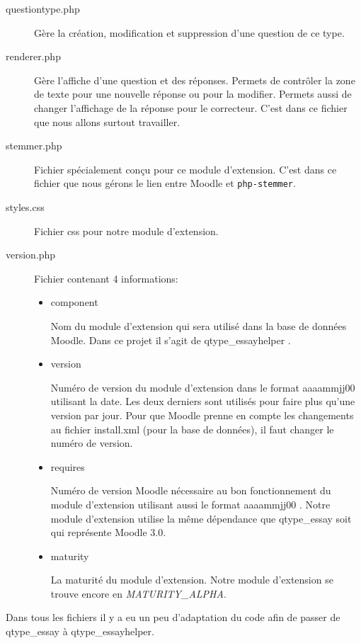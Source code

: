 \begin{description}
 \item[questiontype.php]
 
 G\`ere la cr\'eation, modification et suppression d'une question de ce type.
 
 \item[renderer.php]
 
 G\`ere l'affiche d'une question et des r\'eponses.
 Permets de contr\^oler la zone de texte pour une nouvelle r\'eponse ou pour la modifier.
 Permets aussi de changer l'affichage de la r\'eponse pour le correcteur.
 C'est dans ce fichier que nous allons surtout travailler.
 
 \item[stemmer.php]
 
 Fichier sp\'ecialement con\c{c}u pour ce module d'extension.
 C'est dans ce fichier que nous g\'erons le lien entre Moodle et \texttt{php-stemmer}.
 
 \item[styles.css]
 
 Fichier css pour notre module d'extension.
 
 \item[version.php]
 
 Fichier contenant 4 informations:
 \begin{itemize}
   \item \og component \fg{}
   
   Nom du module d'extension qui sera utilis\'e dans la base de donn\'ees Moodle.
   Dans ce projet il s'agit de \og qtype\_essayhelper \fg{}.
   
   \item \og version \fg{}
   
   Num\'ero de version du module d'extension dans le format \og aaaammjj00 \fg{} utilisant la date.
   Les deux derniers  \fg{} sont utilis\'es pour faire plus qu'une version par jour.
   Pour que Moodle prenne en compte les changements au fichier \og install.xml \fg{} (pour la base de donn\'ees), il faut changer le num\'ero de version.
   
   \item \og requires \fg{}
   
   Num\'ero de version Moodle n\'ecessaire au bon fonctionnement du module d'extension utilisant aussi le format \og aaaammjj00 \fg{}.
   Notre module d'extension utilise la m\^eme d\'ependance que \og qtype\_essay \fg{} soit  \fg{} qui repr\'esente Moodle 3.0.
   
   \item \og maturity \fg{}
   
   La maturit\'e du module d'extension.
   Notre module d'extension se trouve encore en \textit{MATURITY\_ALPHA}.
 \end{itemize}
\end{description}
Dans tous les fichiers il y a eu un peu d'adaptation du code afin de passer de qtype\_essay \`a qtype\_essayhelper.
